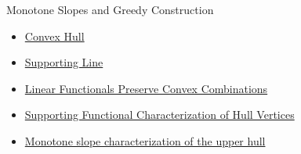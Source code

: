 \begin{topicbox}{Monotone Slopes and Greedy Construction}
\begin{dependencies}
\begin{itemize}
  \item \hyperref[def:computational-geometry-convex-hull]{Convex Hull}
  \item \hyperref[def:computational-geometry-supporting-line]{Supporting Line}
  \item \hyperref[lem:computational-geometry-linear-functionals-convex-combinations]{Linear Functionals Preserve Convex Combinations}
  \item \hyperref[thm:computational-geometry-supporting-functional-hull-vertices]{Supporting Functional Characterization of Hull Vertices}
  \item \hyperref[thm:computational-geometry-monotone-slope-upper-hull]{Monotone slope characterization of the upper hull}
\end{itemize}
\end{dependencies}
\end{topicbox}
